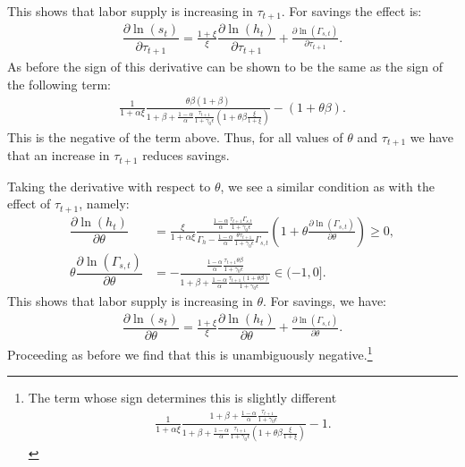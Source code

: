 This shows that labor supply is increasing in $\tau_{t+1}$. For savings the effect is:
\begin{align*}
 \dfrac{\partial \ln\left(s_t\right)}{\partial \tau_{t+1}} = \frac{1+\xi}{\xi}\dfrac{\partial \ln\left(h_t\right)}{\partial \tau_{t+1}}+ \frac{\partial \ln\left(\Gamma_{s,t}\right)}{\partial \tau_{t+1}} . 
 \end{align*}
As before the sign of this derivative can be shown to be the same as the sign of the following term:
\begin{align*}
\frac{1}{1+\alpha \xi}\frac{\theta \beta(1+\beta)}{1+\beta +\frac{1-\alpha}{\alpha}\frac{\tau_{t+1}}{1+\gamma_0 \epsilon}(1+\theta \beta \frac{\xi}{1+\xi})}-(1+\theta \beta).
 \end{align*}
This is the negative of the term above. Thus, for all values of $\theta$ and $\tau_{t+1}$ we have that an increase in $\tau_{t+1}$ reduces savings. 



Taking the derivative with respect to $\theta$, we see a similar condition as with the effect of $\tau_{t+1}$, namely:
\begin{align*}
    \dfrac{\partial \ln\left(h_t\right)}{\partial \theta} &= \frac{\xi}{1+\alpha\xi} \frac{\frac{1-\alpha}{\alpha}\frac{\tau_{t+1} \Gamma_{s,t}}{1+\gamma_0\epsilon}}{\Gamma_h-\frac{1-\alpha}{\alpha}\frac{\theta \tau_{t+1}}{1+\gamma_0\epsilon}\Gamma_{s,t}}\left(1+\theta\frac{\partial \ln\left(\Gamma_{s,t}\right)}{\partial \theta}  \right) \geq 0, \\
    \theta \dfrac{\partial \ln\left(\Gamma_{s,t}\right)}{\partial \theta} &= - \frac{\frac{1-\alpha}{\alpha}\frac{\tau_{t+1}\theta \beta}{1+\gamma_0\epsilon}}{1+\beta+\frac{1-\alpha}{\alpha}\frac{\tau_{t+1}(1+\theta \beta)}{1+\gamma_0\epsilon}} \in (-1,0]. 
\end{align*}
This shows that labor supply is increasing in $\theta$. For savings, we have:
\begin{align*}
\dfrac{\partial \ln\left(s_t\right)}{\partial \theta} = \frac{1+\xi}{\xi}\dfrac{\partial \ln\left(h_t\right)}{\partial \theta}+ \frac{\partial \ln\left(\Gamma_{s,t}\right)}{\partial \theta}.
\end{align*}
Proceeding as before we find that this is unambiguously negative.\footnote{The term whose sign determines this is slightly different
\begin{align*}
\frac{1}{1+\alpha \xi}\frac{1+\beta+\frac{1-\alpha}{\alpha}\frac{\tau_{t+1}}{1+\gamma_0 \epsilon}}{1+\beta+\frac{1-\alpha}{\alpha}\frac{\tau_{t+1}}{1+\gamma_0 \epsilon}(1+\theta \beta \frac{\xi}{1+\xi})}-1.
 \end{align*}
 }

